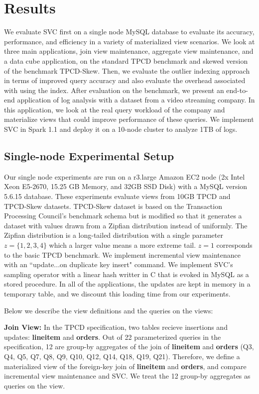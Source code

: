 \vspace{-.5em}
\section{Results}
\label{exp}
We evaluate SVC first on a single node MySQL database to evaluate its accuracy, performance, and efficiency in a variety of materialized view 
scenarios.
We look at three main applications, join view maintenance, aggregate view maintenance, and a data cube application, on the standard TPCD benchmark 
and skewed version of the benchmark TPCD-Skew.
Then, we evaluate the outlier indexing approach in terms of improved query accuracy and also evaluate the overhead associated with using the index.
After evaluation on the benchmark, we present an end-to-end application of log analysis with a dataset from a video streaming company.
In this application, we look at the real query workload of the company and materialize views that could improve performance of these queries.
We implement SVC in Spark 1.1 and deploy it on a 10-node cluster to analyze 1TB of logs.

\subsection{Single-node Experimental Setup}
Our single node experiments are run on a r3.large Amazon EC2 node (2x Intel Xeon E5-2670, 15.25 GB Memory, and 32GB SSD Disk) with a MySQL version 5.6.15 database.
These experiments evaluate views from 10GB TPCD and TPCD-Skew datasets.
TPCD-Skew dataset \cite{tpcdskew} is based on the Transaction Processing Council's benchmark
schema but is modified so that it generates a dataset with values drawn from a Zipfian distribution instead of uniformly.
The Zipfian distribution \cite{mitzenmacher2004brief} is a long-tailed distribution with a single parameter $z=\{1,2,3,4\}$ which a larger
value means a more extreme tail.
$z=1$ corresponds to the basic TPCD benchmark. 
We implement incremental view maintenance with an ``update...on duplicate key insert" command.
We implement SVC's sampling operator  with a linear hash writter in C that is evoked in MySQL as a stored procedure.
In all of the applications, the updates are kept in memory in a temporary table, and we discount this loading time from our experiments.

Below we describe the view definitions and the queries on the views:

\textbf{Join View: } In the TPCD specification, two tables recieve insertions and updates: \textbf{lineitem} and \textbf{orders}.
Out of 22 parameterized queries in the specification, 12 are group-by aggregates of the join of \textbf{lineitem} and \textbf{orders} (Q3, Q4, Q5, Q7, Q8, Q9, Q10, Q12, Q14, Q18, Q19, Q21).
Therefore, we define a materialized view of the foreign-key join of \textbf{lineitem} and \textbf{orders}, and compare incremental view maintenance and SVC.
We treat the 12 group-by aggregates as queries on the view.

